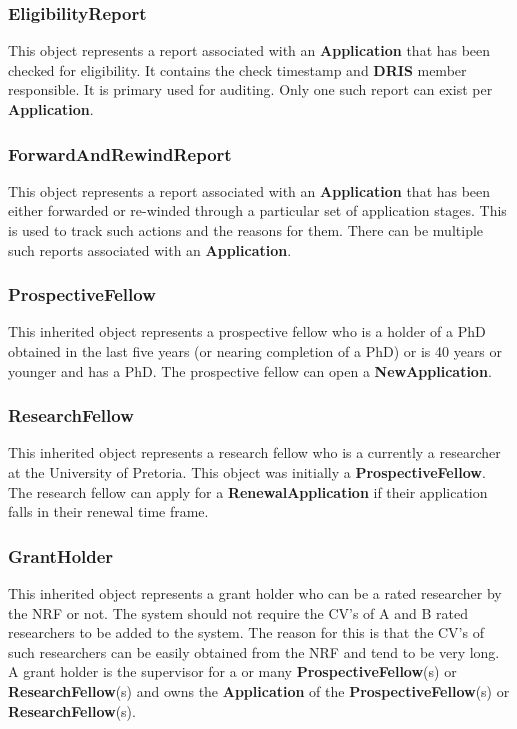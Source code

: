 \documentclass[12pt]{article}
\begin{document}
\subsubsection{EligibilityReport}
This object represents a report associated with an \textbf{Application} that has been checked for eligibility. It contains the check timestamp and \textbf{DRIS} member responsible. It is primary used for auditing. Only one such report can exist per \textbf{Application}.

\subsubsection{ForwardAndRewindReport}
This object represents a report associated with an \textbf{Application} that has been either forwarded or re-winded through a particular set of application stages. This is used to track such actions and the reasons for them. There can be multiple such reports associated with an \textbf{Application}. 
 
\subsubsection{ProspectiveFellow}
This inherited object represents a prospective fellow who is a holder of a PhD obtained in the last five years (or nearing completion of a PhD) or is 40 years or younger and has a PhD. The prospective fellow can open a \textbf{NewApplication}.

\subsubsection{ResearchFellow}
This inherited object represents a research fellow who is a currently a researcher at the University of Pretoria. This object was initially a \textbf{ProspectiveFellow}. The research fellow can apply for a \textbf{RenewalApplication} if their application falls in their renewal time frame.

\subsubsection{GrantHolder}
This inherited object represents a grant holder who can be a rated researcher by the NRF or not. The system should not require the CV's of A and B rated researchers to be added to the system. The reason for this is that the CV's of such researchers can be easily obtained from the NRF and tend to be very long. A grant holder is the supervisor for a or many \textbf{ProspectiveFellow}(s) or \textbf{ResearchFellow}(s) and owns the \textbf{Application} of the \textbf{ProspectiveFellow}(s) or \textbf{ResearchFellow}(s).
\end{document}
